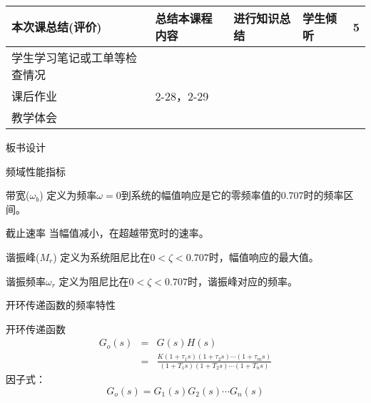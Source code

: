 {\begin{landscape}
\begin{longtable}{|m{10mm}|m{50mm}|m{50mm}|m{50mm}|m{15mm}|}
\centering 本次课总结(评价)&总结本课程内容 &进行知识总结 &学生倾听 &5 \\\hline
\centering 学生学习笔记或工单等检查情况&\multicolumn{4}{m{165mm}|}{\quad}\\\hline
\centering 课后作业&\multicolumn{4}{m{165mm}|}{2-28，2-29}\\\hline
\centering 教学体会&\multicolumn{4}{m{165mm}|}{\quad}\\
\end{longtable}

\end{landscape}
\clearpage
\begin{center}
{\huge 板书设计}
\end{center}
}
 \begin{frame}{频域性能指标} 
 \begin{block}{带宽($\omega_b$)}
 定义为频率$\omega=0$到系统的幅值响应是它的零频率值的0.707时的频率区间。
 \end{block}
 \begin{block}{截止速率}
当幅值减小，在超越带宽时的速率。
 \end{block}
 \begin{block}{谐振峰($M_r$)} 
 定义为系统阻尼比在$0<\zeta <0.707$时，幅值响应的最大值。
 \end{block}
 \end{frame}
 \begin{frame}
 \begin{block}{谐振频率$\omega_r$}
定义为阻尼比在$0<\zeta <0.707$时，谐振峰对应的频率。
 \end{block}
 \end{frame}
 
 \begin{frame}{开环传递函数的频率特性}
 \begin{block}{开环传递函数}
\begin{eqnarray*}
G_o(s)&=&G(s)H(s)\\
&=&\frac{K(1+\tau_1s)(1+\tau_2s)\cdots(1+\tau_ms)}{(1+T_1s)(1+T_2s)\cdots(1+T_ns)}
\end{eqnarray*}
因子式：
\[G_o(s)=G_1(s)G_2(s)\cdots G_n(s)\]
\end{block}
\end{frame}

